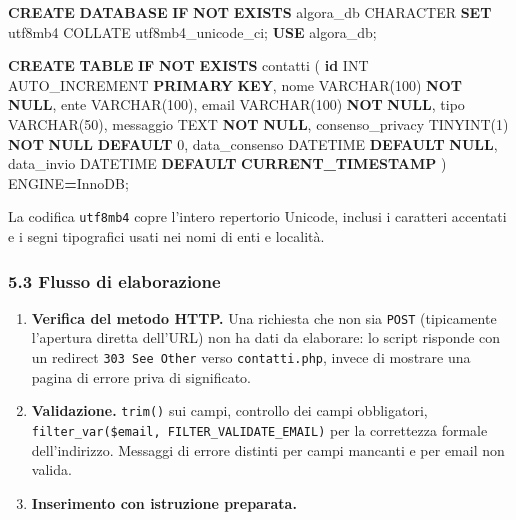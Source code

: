 \documentclass[
  11pt,
]{article}
\newenvironment{Shaded}{\begin{snugshade}}{\end{snugshade}}
\newcommand{\ControlFlowTok}[1]{\textcolor[rgb]{0.13,0.29,0.53}{\textbf{#1}}}
\newcommand{\DataTypeTok}[1]{\textcolor[rgb]{0.13,0.29,0.53}{#1}}
\newcommand{\DecValTok}[1]{\textcolor[rgb]{0.00,0.00,0.81}{#1}}
\newcommand{\FunctionTok}[1]{\textcolor[rgb]{0.13,0.29,0.53}{\textbf{#1}}}
\newcommand{\KeywordTok}[1]{\textcolor[rgb]{0.13,0.29,0.53}{\textbf{#1}}}
\newcommand{\NormalTok}[1]{#1}
\newcommand{\OperatorTok}[1]{\textcolor[rgb]{0.81,0.36,0.00}{\textbf{#1}}}
\providecommand{\tightlist}{%
  \setlength{\itemsep}{0pt}\setlength{\parskip}{0pt}}
\begin{document}
\begin{Shaded}
\begin{Highlighting}[]
\KeywordTok{CREATE} \KeywordTok{DATABASE} \ControlFlowTok{IF} \KeywordTok{NOT} \KeywordTok{EXISTS}\NormalTok{ algora\_db}
    \DataTypeTok{CHARACTER} \KeywordTok{SET}\NormalTok{ utf8mb4 COLLATE utf8mb4\_unicode\_ci;}
\KeywordTok{USE}\NormalTok{ algora\_db;}

\KeywordTok{CREATE} \KeywordTok{TABLE} \ControlFlowTok{IF} \KeywordTok{NOT} \KeywordTok{EXISTS}\NormalTok{ contatti (}
    \KeywordTok{id}               \DataTypeTok{INT}\NormalTok{ AUTO\_INCREMENT }\KeywordTok{PRIMARY} \KeywordTok{KEY}\NormalTok{,}
\NormalTok{    nome             }\DataTypeTok{VARCHAR}\NormalTok{(}\DecValTok{100}\NormalTok{) }\KeywordTok{NOT} \KeywordTok{NULL}\NormalTok{,}
\NormalTok{    ente             }\DataTypeTok{VARCHAR}\NormalTok{(}\DecValTok{100}\NormalTok{),}
\NormalTok{    email            }\DataTypeTok{VARCHAR}\NormalTok{(}\DecValTok{100}\NormalTok{) }\KeywordTok{NOT} \KeywordTok{NULL}\NormalTok{,}
\NormalTok{    tipo             }\DataTypeTok{VARCHAR}\NormalTok{(}\DecValTok{50}\NormalTok{),}
\NormalTok{    messaggio        TEXT         }\KeywordTok{NOT} \KeywordTok{NULL}\NormalTok{,}
\NormalTok{    consenso\_privacy TINYINT(}\DecValTok{1}\NormalTok{)   }\KeywordTok{NOT} \KeywordTok{NULL} \KeywordTok{DEFAULT} \DecValTok{0}\NormalTok{,}
\NormalTok{    data\_consenso    DATETIME     }\KeywordTok{DEFAULT} \KeywordTok{NULL}\NormalTok{,}
\NormalTok{    data\_invio       DATETIME     }\KeywordTok{DEFAULT} \FunctionTok{CURRENT\_TIMESTAMP}
\NormalTok{) ENGINE}\OperatorTok{=}\NormalTok{InnoDB;}
\end{Highlighting}
\end{Shaded}

La codifica \texttt{utf8mb4} copre l'intero repertorio Unicode, inclusi
i caratteri accentati e i segni tipografici usati nei nomi di enti e
località.

\hypertarget{flusso-di-elaborazione}{%
\subsubsection{5.3 Flusso di
elaborazione}\label{flusso-di-elaborazione}}

\begin{enumerate}
\def\labelenumi{\arabic{enumi}.}
\tightlist
\item
  \textbf{Verifica del metodo HTTP.} Una richiesta che non sia
  \texttt{POST} (tipicamente l'apertura diretta dell'URL) non ha dati da
  elaborare: lo script risponde con un redirect \texttt{303\ See\ Other}
  verso \texttt{contatti.php}, invece di mostrare una pagina di errore
  priva di significato.
\item
  \textbf{Validazione.} \texttt{trim()} sui campi, controllo dei campi
  obbligatori, \texttt{filter\_var(\$email,\ FILTER\_VALIDATE\_EMAIL)}
  per la correttezza formale dell'indirizzo. Messaggi di errore distinti
  per campi mancanti e per email non valida.
\item
  \textbf{Inserimento con istruzione preparata.}
\end{enumerate}
\end{document}
